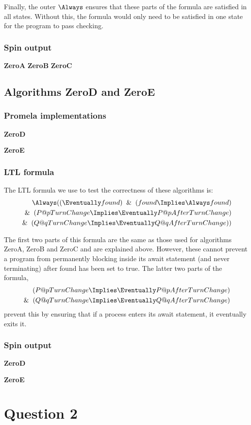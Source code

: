 \documentclass[12pt,a4paper]{scrartcl}
\begin{document}
Finally, the outer \(\Always\) ensures that these parts of the formula are satisfied in all states. Without this, the formula would only need to be satisfied in one state for the program to pass checking.

\subsubsection{Spin output}
\textbf{ZeroA}
\textbf{ZeroB}
\textbf{ZeroC}

\subsection{Algorithms ZeroD and ZeroE}

\subsubsection{Promela implementations}

\textbf{ZeroD}


\textbf{ZeroE}


\subsubsection{LTL formula}

The LTL formula we use to test the correctness of these algorithms is:
\begin{align} 
\Always ( ( \Eventually found ) \And ( found \Implies \Always found )\notag\\
\And ( P@pTurnChange \Implies \Eventually P@pAfterTurnChange )\\
\And ( Q@qTurnChange \Implies \Eventually Q@qAfterTurnChange ) )\notag
\end{align}

The first two parts of this formula are the same as those used for algorithms ZeroA, ZeroB and ZeroC and are explained above. However, these cannot prevent a program from permanently blocking inside its await statement (and never terminating) after found has been set to true. The latter two parts of the formula,
\begin{align} 
( P@pTurnChange \Implies \Eventually P@pAfterTurnChange )\notag\\
\And ( Q@qTurnChange \Implies \Eventually Q@qAfterTurnChange ) 
\end{align}
prevent this by ensuring that if a process enters its await statement, it eventually exits it.

\subsubsection{Spin output}

\textbf{ZeroD}

\textbf{ZeroE}

\section{Question 2}
\end{document}
